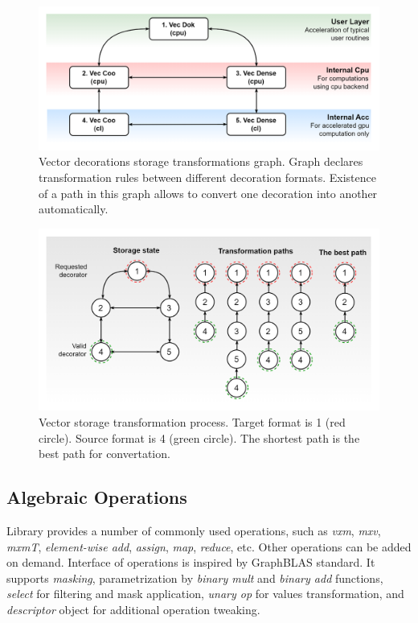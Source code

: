 \begin{figure}
    \centering
    \includegraphics[width=1.0\textwidth]{images/spla_storage_transformation_graph.png}
    \caption{Vector decorations storage transformations graph. Graph declares transformation rules between different decoration formats. Existence of a path in this graph allows to convert one decoration into another automatically.}
    \label{fig:vec_storage_graph}
\end{figure}

\begin{figure}
    \centering
    \includegraphics[width=1.0\textwidth]{images/spla_storage_transformation.png}
    \caption{Vector storage transformation process. Target format is 1 (red circle). Source format is 4 (green circle). The shortest path is the best path for convertation.}
    \label{fig:vec_transform_path}
\end{figure}

\subsection{Algebraic Operations}

Library provides a number of commonly used operations, such as \textit{vxm}, \textit{mxv}, \textit{mxmT}, \textit{element-wise add}, \textit{assign}, \textit{map}, \textit{reduce}, etc. Other operations can be added on demand. Interface of operations is inspired by GraphBLAS standard.  It supports \textit{masking}, parametrization by \textit{binary mult} and \textit{binary add} functions, \textit{select} for filtering and mask application, \textit{unary op} for values transformation, and \textit{descriptor} object for additional operation tweaking.

